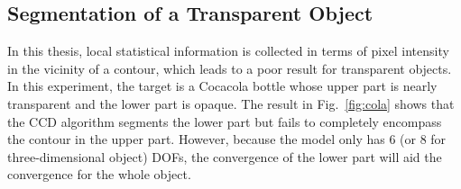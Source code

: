 \subsection{Segmentation of a Transparent Object}
\label{sec:sto}
In this thesis, local statistical information is collected in terms of
pixel intensity in the vicinity of a contour, which leads to a poor
result for transparent objects. In this experiment, the
target is a Cocacola bottle whose upper part is nearly transparent and the
lower part is opaque. The result in Fig.~\ref{fig:cola} shows that the CCD algorithm
segments the lower part but fails to completely encompass the contour in the
upper part. However, because the model only has 6 (or 8
for three-dimensional object) DOFs, the convergence of the lower part will aid the convergence for the whole object.
\begin{figure}[htbp] 
  \begin{minipage}[t]{0.5\linewidth} 
    \centering 
  \end{minipage}%
  \begin{minipage}[t]{0.5\linewidth} 
    \centering 
  \end{minipage} 
  \begin{minipage}[t]{0.5\linewidth} 
    \centering 

\end{minipage}
\end{figure}
